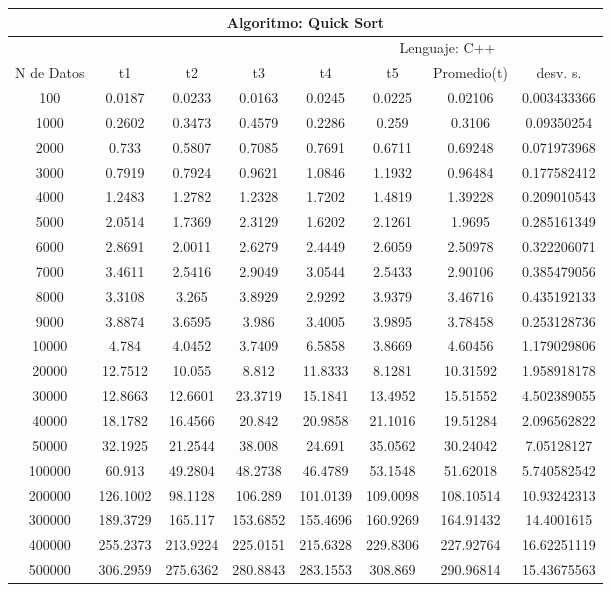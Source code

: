 \documentclass{article}
\begin{document}
    \begin{table}[]
        \begin{tabular}{|c|c|c|c|c|c|c|c| }
            \hline
            \multicolumn{8}{|c|}{Algoritmo: Quick Sort} \\ \hline
            \multicolumn{4}{|c|}{} & \multicolumn{4}{c|}{Lenguaje: C++} \\ \hline
              N de Datos &     t1    &  t2         &  t3          &   t4        &    t5     &   Promedio(t)       & desv. s. \\ \hline
100	    &0.0187	&0.0233	&0.0163	&0.0245	&0.0225	&0.02106	&0.003433366 \\ \hline
1000	&0.2602	&0.3473	&0.4579	&0.2286	&0.259	&0.3106	&0.09350254 \\ \hline
2000	&0.733	&0.5807	&0.7085	&0.7691	&0.6711	&0.69248	&0.071973968 \\ \hline
3000	&0.7919	&0.7924	&0.9621	&1.0846	&1.1932	&0.96484	&0.177582412 \\ \hline
4000	&1.2483	&1.2782	&1.2328	&1.7202	&1.4819	&1.39228	&0.209010543 \\ \hline
5000	&2.0514	&1.7369	&2.3129	&1.6202	&2.1261	&1.9695	&0.285161349 \\ \hline
6000	&2.8691	&2.0011	&2.6279	&2.4449	&2.6059	&2.50978	&0.322206071 \\ \hline
7000	&3.4611	&2.5416	&2.9049	&3.0544	&2.5433	&2.90106	&0.385479056 \\ \hline
8000	&3.3108	&3.265	&3.8929	&2.9292	&3.9379	&3.46716	&0.435192133 \\ \hline
9000	&3.8874	&3.6595	&3.986	&3.4005	&3.9895	&3.78458	&0.253128736 \\ \hline
10000	&4.784	&4.0452	&3.7409	&6.5858	&3.8669	&4.60456	&1.179029806 \\ \hline
20000	&12.7512	&10.055	&8.812	&11.8333	&8.1281	&10.31592&	1.958918178 \\ \hline
30000	&12.8663	&12.6601	&23.3719	&15.1841	&13.4952	&15.51552&	4.502389055 \\ \hline
40000	&18.1782	&16.4566	&20.842	&20.9858	&21.1016	&19.51284&	2.096562822 \\ \hline
50000	&32.1925	&21.2544	&38.008	&24.691	&35.0562	&30.24042&	7.05128127 \\ \hline
100000	&60.913	&49.2804	&48.2738	&46.4789	&53.1548	&51.62018&	5.740582542 \\ \hline
200000	&126.1002	&98.1128	    &106.289	    &101.0139	&109.0098&	108.10514&	10.93242313 \\ \hline
300000	&189.3729	&165.117	    &153.6852	&155.4696	&160.9269&	164.91432&	14.4001615 \\ \hline
400000	&255.2373	&213.9224	&225.0151	&215.6328	&229.8306&	227.92764&	16.62251119 \\ \hline
500000	&306.2959	&275.6362	&280.8843	&283.1553	&308.869	 &    290.96814&	15.43675563 \\ \hline


        \end{tabular}
    \end{table}
\end{document}
